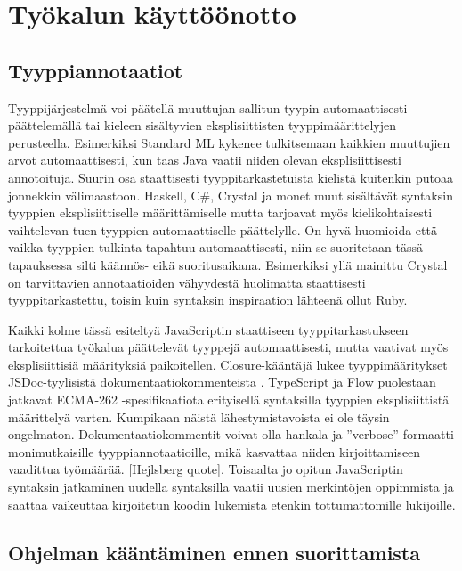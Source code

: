 \chapter{Työkalun käyttöönotto}

\section{Tyyppiannotaatiot}

Tyyppijärjestelmä voi päätellä muuttujan sallitun tyypin automaattisesti
päättelemällä tai kieleen sisältyvien eksplisiittisten tyyppimäärittelyjen
perusteella. Esimerkiksi Standard ML kykenee tulkitsemaan kaikkien muuttujien
arvot automaattisesti, kun taas Java vaatii niiden olevan eksplisiittisesti
annotoituja. Suurin osa staattisesti tyyppitarkastetuista kielistä kuitenkin
putoaa jonnekkin välimaastoon. Haskell, C\#, Crystal ja monet muut sisältävät
syntaksin tyyppien eksplisiittiselle määrittämiselle mutta tarjoavat myös
kielikohtaisesti vaihtelevan tuen tyyppien automaattiselle päättelylle.
On hyvä huomioida että vaikka tyyppien tulkinta tapahtuu automaattisesti,
niin se suoritetaan tässä tapauksessa silti käännös- eikä suoritusaikana.
Esimerkiksi yllä mainittu Crystal on tarvittavien annotaatioiden vähyydestä
huolimatta staattisesti tyyppitarkastettu, toisin kuin syntaksin inspiraation
lähteenä ollut Ruby.

Kaikki kolme tässä esiteltyä JavaScriptin staattiseen tyyppitarkastukseen
tarkoitettua työkalua päättelevät tyyppejä automaattisesti, mutta vaativat
myös eksplisiittisiä määrityksiä paikoitellen. Closure-kääntäjä lukee
tyyppimääritykset JSDoc-tyylisistä dokumentaatiokommenteista \cite{annotatingJSforClosure}.
TypeScript ja Flow puolestaan jatkavat ECMA-262 -spesifikaatiota erityisellä syntaksilla
tyyppien eksplisiittistä määrittelyä varten. Kumpikaan näistä
lähestymistavoista ei ole täysin ongelmaton. Dokumentaatiokommentit voivat
olla hankala ja ”verbose” formaatti monimutkaisille tyyppiannotaatioille,
mikä kasvattaa niiden kirjoittamiseen vaadittua työmäärää. [Hejlsberg quote].
Toisaalta jo opitun JavaScriptin syntaksin jatkaminen uudella syntaksilla
vaatii uusien merkintöjen oppimmista ja saattaa vaikeuttaa kirjoitetun koodin
lukemista etenkin tottumattomille lukijoille.

\section{Ohjelman kääntäminen ennen suorittamista}

